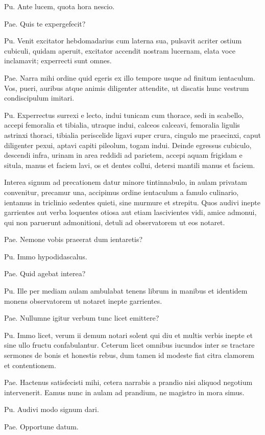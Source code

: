 \documentclass{article}
\begin{document}
Pu. Ante lucem, quota hora nescio. 

Pae. Quis te expergefecit?

Pu. Venit excitator hebdomadarius cum laterna sua, pulsavit acriter ostium cubiculi, quidam aperuit, excitator accendit nostram lucernam, elata voce inclamavit; experrecti sunt omnes. 

Pae. Narra mihi ordine quid egeris ex illo tempore usque ad finitum ientaculum. Vos, pueri, auribus atque animis diligenter attendite, ut discatis hunc vestrum condiscipulum imitari. 

Pu. Experrectus surrexi e lecto, indui tunicam cum thorace, sedi in scabello, accepi femoralia et tibialia, utraque indui, calceos calceavi, femoralia ligulis astrinxi thoraci, tibialia periscelide ligavi super crura, cingulo me praecinxi, caput diligenter pexui, aptavi capiti pileolum, togam indui. Deinde egressus cubiculo, descendi infra, urinam in area reddidi ad parietem, accepi aquam frigidam e situla, manus et faciem lavi, os et dentes collui, detersi mantili manus et faciem. 

Interea signum ad precationem datur minore tintinnabulo, in aulam privatam convenitur, precamur una, accipimus ordine ientaculum a famulo culinario, ientamus in triclinio sedentes quieti, sine murmure et strepitu. Quos audivi inepte garrientes aut verba loquentes otiosa aut etiam lascivientes vidi, amice admonui, qui non paruerunt admonitioni, detuli ad observatorem ut eos notaret. 

Pae. Nemone vobis praeerat dum ientaretis?

Pu. Immo hypodidascalus. 

Pae. Quid agebat interea?

Pu. Ille per mediam aulam ambulabat tenens librum in manibus et identidem monens observatorem ut notaret inepte garrientes. 

Pae. Nullumne igitur verbum tunc licet emittere?

Pu. Immo licet, verum ii demum notari solent qui diu et multis verbis inepte et sine ullo fructu confabulantur. Ceterum licet omnibus iucundos inter se tractare sermones de bonis et honestis rebus, dum tamen id modeste fiat citra clamorem et contentionem. 

Pae. Hactenus satisfecisti mihi, cetera narrabis a prandio nisi aliquod negotium intervenerit. Eamus nunc in aulam ad prandium, ne magistro in mora simus. 

Pu. Audivi modo signum dari. 

Pae. Opportune datum.
\end{document}
